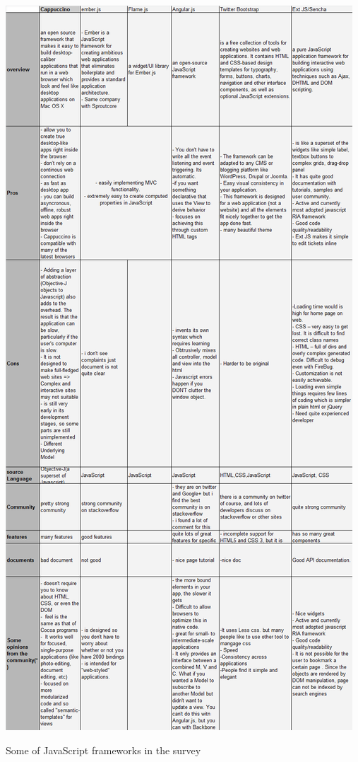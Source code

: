 \documentclass[14pt,a4paper]{extreport}
\begin{document}
			\begin{table}
				\begin{center}
					\includegraphics[scale=0.4]{JavaFrameTable2.png}
				
					\caption{Some of JavaScript frameworks in the survey}
				\end{center}
			
			\end{table}
\end{document}
